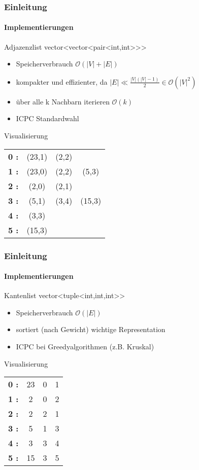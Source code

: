 \begin{frame}
    \frametitle{Einleitung}
    \framesubtitle{Implementierungen}
    \begin{KITexampleblock}{Adjazenzlist}
    vector<vector<pair<int,int>{}>{}>
    \begin{itemize}
        \item Speicherverbrauch \( \mathcal{O}(|V|+|E|)\)
        \item kompakter und effizienter, da \( |E| \ll \frac{|V| (|V| - 1)}{2} \in \mathcal{O}(|V|^2)\)
        \item über alle k Nachbarn iterieren \( \mathcal{O}(k)\)
        \item ICPC Standardwahl
    \end{itemize}
    \end{KITexampleblock}
    \vspace{0.001em}
    \begin{KITinfoblock}{Visualisierung}
    \begin{tabular}{l c c c}
        \textbf{0 :  } & (23,1) & (2,2) \\
        \textbf{1 :  } & (23,0) & (2,2) & (5,3) \\
        \textbf{2 :  } & (2,0) & (2,1) \\
        \textbf{3 :  } & (5,1) & (3,4) & (15,3) \\
        \textbf{4 :  } & (3,3) \\
        \textbf{5 :  } & (15,3) \\
    \end{tabular}
    \end{KITinfoblock}
\end{frame}

\begin{frame}
    \frametitle{Einleitung}
    \framesubtitle{Implementierungen}
    \begin{KITexampleblock}{Kantenlist}
    vector<tuple<int,int,int>{}>
    \begin{itemize}
        \item Speicherverbrauch \( \mathcal{O}(|E|)\)
        \item sortiert (nach Gewicht) wichtige Representation
        \item ICPC bei Greedyalgorithmen (z.B. Kruskal)
    \end{itemize}
    \end{KITexampleblock}
    \vspace{0.001em}
    \begin{KITinfoblock}{Visualisierung}
    \begin{tabular}{l c c c}
        \textbf{0 :  } & 23 & 0 & 1 \\
        \textbf{1 :  } & 2 & 0 & 2 \\
        \textbf{2 :  } & 2 & 2 & 1 \\
        \textbf{3 :  } & 5 & 1 & 3 \\
        \textbf{4 :  } & 3 & 3 & 4 \\
        \textbf{5 :  } & 15 & 3 & 5 \\
    \end{tabular}
    \end{KITinfoblock}
\end{frame}
